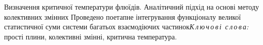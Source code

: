\documentclass[fleqn,twoside,twocolumn,nofootinbib,showkeys]{revtex4} %
\begin{document}
\renewcommand{\theequation}{A.\arabic{equation}}
\setcounter{equation}{0}





\vskip3mm \textit{}



\vspace*{-5mm}  {Визначення критичної температури флюїдів. Аналітичний підхід на основі методу колективних змінних} {Проведено поетапне інтегрування функціоналу великої статистичної суми системи багатьох взаємодіючих частинок}{\textit{К\,л\,ю\,ч\,о\,в\,і\,
с\,л\,о\,в\,а:} прості плини, колективні змінні, критична температура.}
\end{document}
